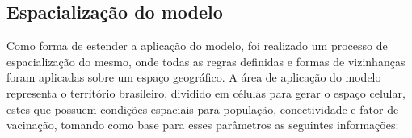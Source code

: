 \documentclass[a4paper,12pt]{article}
\begin{document}



\newpage
\subsection{Espacialização do modelo}

Como forma de estender a aplicação do modelo, foi realizado um processo de espacialização do mesmo, onde todas as regras definidas e formas de vizinhanças foram aplicadas sobre um espaço geográfico. A área de aplicação do modelo representa o território brasileiro, dividido em células para gerar o espaço celular, estes que possuem condições espaciais para população, conectividade e fator de vacinação, tomando como base para esses parâmetros as seguintes informações:
\end{document}
